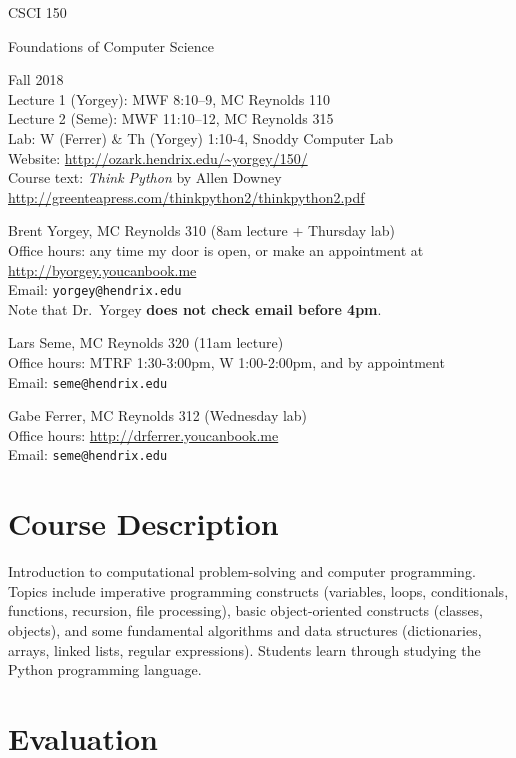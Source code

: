 \documentclass{article}
\begin{document}
{\Large
\noindent CSCI 150 \smallskip

\noindent Foundations of Computer Science \bigskip
}

\noindent Fall 2018 \\
Lecture 1 (Yorgey): MWF 8:10--9, MC Reynolds 110\\
Lecture 2 (Seme): MWF 11:10--12, MC Reynolds 315\\
Lab: W (Ferrer) \& Th (Yorgey) 1:10-4, Snoddy Computer Lab\\
Website: \url{http://ozark.hendrix.edu/~yorgey/150/} \\
Course text: \emph{Think Python} by Allen Downey \\
\indent \url{http://greenteapress.com/thinkpython2/thinkpython2.pdf}
\medskip

\noindent Brent Yorgey, MC Reynolds 310 (8am lecture + Thursday lab)\\
Office hours: any time my door is open, or make an appointment at \\
\indent \url{http://byorgey.youcanbook.me} \\
Email: \texttt{yorgey@hendrix.edu} \\
Note that Dr.\ Yorgey \textbf{does not check email before 4pm}.\medskip

\noindent Lars Seme, MC Reynolds 320 (11am lecture)\\
Office hours: MTRF 1:30-3:00pm, W 1:00-2:00pm, and by appointment \\
Email: \texttt{seme@hendrix.edu}

\noindent Gabe Ferrer, MC Reynolds 312 (Wednesday lab)\\
Office hours: \url{http://drferrer.youcanbook.me} \\
Email: \texttt{seme@hendrix.edu}


\section*{Course Description}

Introduction to computational problem-solving and computer
programming. Topics include imperative programming constructs
(variables, loops, conditionals, functions, recursion, file
processing), basic object-oriented constructs (classes, objects), and
some fundamental algorithms and data structures (dictionaries, arrays,
linked lists, regular expressions). Students learn through studying
the Python programming language.

\section*{Evaluation}
\end{document}
